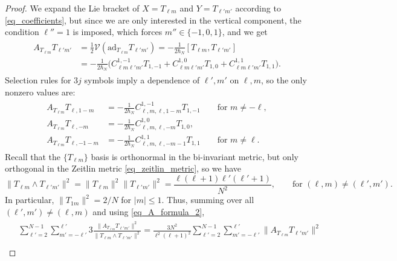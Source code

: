 \documentclass[10pt,a4paper]{amsart}
\newcommand{\ad}{\mathrm{ad}}
\begin{document}
\begin{proof}
We expand the Lie bracket of $X = T_{\ell m}$ and $Y = T_{\ell'm'}$ according to  \eqref{eq_coefficients}, but since we are only interested in the vertical component, the condition $\ell'' = 1$ is imposed, which forces  $m''\in\{-1,0,1\}$, and we get 
\begin{gather}\label{eq_A_formula_1}
\begin{split}
A_{T_{\ell m}}T_{\ell' m'} &= \frac{1}{2}\mathcal{V} (\ad_{T_{\ell m}} T_{\ell'm'})  =-\frac{1}{2\hbar_N} 
[T_{\ell m}, T_{\ell' m'}] \\
&= -\frac{1}{2\hbar_N}\Big(C_{\ell m\ell' m'}^{1,-1}T_{1,-1} + C_{\ell m\ell' m'}^{1,0}T_{1,0} + C_{\ell m\ell' m'}^{1,1}T_{1,1}\Big).
\end{split}
\end{gather}
Selection rules for $3j$ symbols imply a dependence of $\ell', m'$ on $\ell, m$, so the only nonzero values are:
\begin{gather}\label{eq_A_formula_2}
\begin{split}
A_{T_{\ell m}}T_{\ell, 1-m}
&=
-\tfrac{1}{2\hbar_N}C_{\ell,m,\ell,1-m}^{1,-1}T_{1,-1} \qquad \text{for $m \neq -\ell$}, \\
A_{T_{\ell m}}T_{\ell, -m} 
&=
-\tfrac{1}{2\hbar_N}C_{\ell,m,\ell,-m}^{1,0}T_{1,0}, \\
A_{T_{\ell m}}T_{\ell, -1-m}
&=
-\tfrac{1}{2\hbar_N}C_{\ell,m,\ell,-m-1}^{1,1}T_{1,1} \qquad \text{for $m \neq \ell$}.
\end{split}
\end{gather}
Recall that the $\{ T_{\ell m} \}$ basis is orthonormal in the bi-invariant metric, but only orthogonal in the Zeitlin metric \eqref{eq_zeitlin_metric}, so we have \begin{equation*}
\| T_{\ell m} \wedge T_{\ell' m'} \|^2 = \|T_{\ell m}\|^2\|T_{\ell'm'}\|^2 = \frac{\ell(\ell+1)\ell'(\ell'+1)}{N^2}, \qquad \text{for $(\ell, m) \neq (\ell',m')$}.
\end{equation*}
In particular, $\|T_{1m}\|^2 = 2/N$ for $|m| \leq 1$. Thus, summing over all $(\ell', m') \neq (\ell, m)$ and using \eqref{eq_A_formula_2},
\begin{gather*}
\begin{split}
&\sum\limits_{\ell' = 2}^{N-1}
\sum\limits_{m' = -\ell'}^{\ell'} 3\frac{\|A_{T_{\ell m}}T_{\ell'm'}\|^2}{\|T_{\ell m} \wedge T_{\ell'm'}\|^2}
=
\frac{3N^2}{\ell^2(\ell+1)^2} \sum\limits_{\ell' = 2}^{N-1}
\sum\limits_{m' = -\ell'}^{\ell'} \|A_{T_{\ell m}}T_{\ell'm'}\|^2 \\

\end{split}
\end{gather*}
\end{proof}
\end{document}
